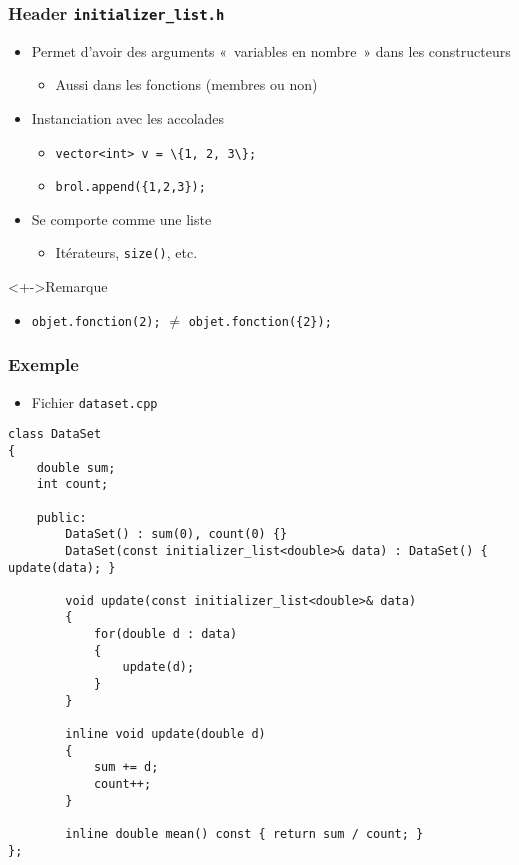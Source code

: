 \begin{frame}
\frametitle{Header \texttt{initializer\_list.h}}
\begin{itemize}[<+->]
\item Permet d'avoir des arguments «~variables en nombre~» dans les constructeurs
	\begin{itemize}
	\item Aussi dans les fonctions (membres ou non)
	\end{itemize}
\item Instanciation avec les accolades
	\begin{itemize}
	\item \lstinline|vector<int> v = \{1, 2, 3\};|
	\item \texttt{brol.append(\{1,2,3\});}
	\end{itemize}
\item Se comporte comme une liste
	\begin{itemize}
	\item Itérateurs, \texttt{size()}, etc.
	\end{itemize}
\end{itemize}
\begin{exampleblock}<+->{Remarque}
	\begin{itemize}[<+->]
	\item \texttt{objet.fonction(2);} $\neq$ \texttt{objet.fonction(\{2\});}
	\end{itemize}
\end{exampleblock}
\end{frame}

\begin{frame}[containsverbatim]
\frametitle{Exemple}
\begin{itemize}
\item Fichier \texttt{dataset.cpp}
\end{itemize}
\begin{lstlisting}
class DataSet
{
	double sum;
	int count;

	public:
		DataSet() : sum(0), count(0) {}
		DataSet(const initializer_list<double>& data) : DataSet() { update(data); }		

		void update(const initializer_list<double>& data)
		{
			for(double d : data)
			{
				update(d);
			}
		}

		inline void update(double d)
		{
			sum += d;
			count++;
		}		

		inline double mean() const { return sum / count; }
};
\end{lstlisting}
\end{frame}

